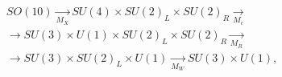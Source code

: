 \documentclass[10pt]{article}
\begin{document}
\[

\begin{aligned}

& S O(10) \underset{M_{X}}{\longrightarrow} S U(4) \times S U(2)_{L} \times S U(2)_{R} \underset{M_{c}}{\longrightarrow} \\

& \rightarrow S U(3) \times U(1) \times S U(2)_{L} \times S U(2)_{R} \underset{M_{R}}{\longrightarrow} \\

& \rightarrow S U(3) \times S U(2)_{L} \times U(1) \underset{M_{W}}{\longrightarrow} S U(3) \times U(1),

\end{aligned}

\]
\end{document}
